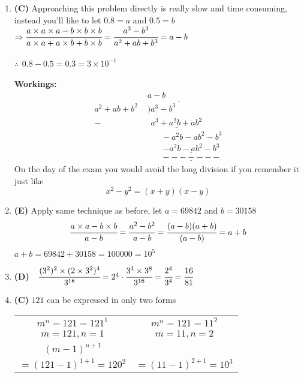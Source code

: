 \begin{multicols}{2}
\begin{enumerate}[label={\arabic*.}]
    \item \textbf{(C)} Approaching this problem directly is really slow and time consuming, instead you'll like to let $0.8  = a$ and $0.5 = b$ \\
    $\Rightarrow \cfrac{a \times a \times a - b \times b \times b}{a \times a + a \times b + b \times b} = \cfrac{a^3 - b^3}{a^2 + ab + b^3} = a - b $  \\\\
    $\therefore \hspace{5pt} 0.8 - 0.5 = 0.3 = 3 \times 10^{-1}$ \\\\
    \textbf{Workings:} \vspace{-10pt}
    \begin{align*} 
        & a - b\\
       a^2 + ab + b^2\,\, &\overline{)a^3 - b^3 \hspace{50pt}} \\
       -& \hspace{5pt} \underline{a^3 + a^{2}b + ab^2} \\ 
       & \hspace{20pt} -a^2b -ab^2 -b^3 \\
       & \hspace{22pt} \underline{-a^2b - ab^2 - b^3} \\
       & \hspace{22pt} \underline{-------}
    \end{align*}
    On the day of the exam you would avoid the long division if you remember it just like $$x^2 - y^2 = (x+y)(x-y)$$

    \item \textbf{(E)} Apply same technique as before, let $a = 69842$ and $b = 30158$ \\
    $$\cfrac{a \times a - b \times b }{a - b} = \cfrac{a^2 - b^2}{a-b} = \cfrac{(a-b)(a+b)}{(a-b)} = a+b $$
    $a+ b = 69842 + 30158  = 100000 = 10^5$
    \item \textbf{(D)} \, \,$\cfrac{(3^2)^2 \times (2 \times 3^2)^4}{3^{16}} = 2^4 \cdot \cfrac{3^4 \times 3^8}{3^{16}} = \cfrac{2^4}{3^4} = \cfrac{16}{81}$
    \item \textbf{(C)} $121$ can be expressed in only two forms 
    \begin{tabular}{c|c}
        $m^n = 121 = 121^1$ & $m^n = 121 = 11^2$ \\
        $m = 121, n = 1$& $m = 11, n = 2$ \\
        $(m-1)^{n+1}$ & \\
         $= (121-1)^{1+1} = 120^2$ & $=(11 - 1)^{2+1} = 10^3$ \\
        

\end{tabular}
\end{enumerate}
\end{multicols}
